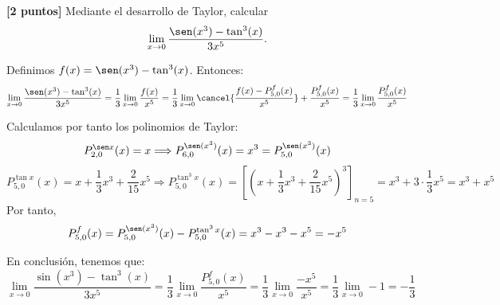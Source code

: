 \documentclass[12pt]{article}
\begin{document}
\begin{ejercicio}\textbf{[2 puntos]} Mediante el desarrollo de Taylor, calcular
    \begin{equation*}
        \lim_{x\to 0} \frac{\sen (x^3) - \tan^3(x)}{3x^5}.
    \end{equation*}
    
    Definimos $f(x)=\sen (x^3) - \tan^3(x)$. Entonces:
    \begin{equation*}
        \lim_{x\to 0} \frac{\sen (x^3) - \tan^3(x)}{3x^5} = \frac{1}{3}\lim_{x\to 0} \frac{f(x)}{x^5}
        = \frac{1}{3}\lim_{x\to 0} \cancel{\frac{f(x)-P_{5,0}^f(x)}{x^5}} + \frac{P_{5,0}^f(x)}{x^5}
        = \frac{1}{3}\lim_{x\to 0} \frac{P_{5,0}^f(x)}{x^5}
    \end{equation*}
    
    Calculamos por tanto los polinomios de Taylor:
    \begin{equation*}
        P_{2, 0}^{\sen x}(x) = x
        \Longrightarrow
        P_{6, 0}^{\sen (x^3)}(x) = x^3 = P_{5, 0}^{\sen (x^3)}(x)
    \end{equation*}
    \begin{equation*}
        P_{5, 0}^{\tan x}(x) = x+\frac{1}{3}x^3 + \frac{2}{15}x^5
        \Longrightarrow
        P_{5, 0}^{\tan^3 x}(x) = \left[\left( x+\frac{1}{3}x^3 + \frac{2}{15}x^5\right)^3\right]_{n=5} = x^3 + 3\cdot \frac{1}{3}x^5 = x^3+x^5
    \end{equation*}
    Por tanto, 
    \begin{equation*}
        P_{5,0}^f(x) = P_{5, 0}^{\sen (x^3)}(x) - P_{5, 0}^{\tan^3 x}(x) = x^3 - x^3 -x^5 = -x^5
    \end{equation*}

    En conclusión, tenemos que:
    \begin{equation*}
        \lim_{x\to 0} \frac{\sin (x^3) - \tan^3(x)}{3x^5}
        = \frac{1}{3}\lim_{x\to 0} \frac{P_{5,0}^f(x)}{x^5}
        = \frac{1}{3}\lim_{x\to 0} \frac{-x^5}{x^5}
        = \frac{1}{3}\lim_{x\to 0} -1 = -\frac{1}{3}
    \end{equation*}
\end{ejercicio}
\end{document}
